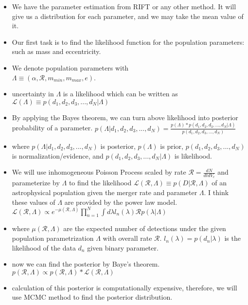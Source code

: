 \documentclass[twocolumn,prd,nofootinbib]{revtex4}
\begin{document}
\begin{itemize}
    \item We have the parameter estimation from RIFT or any other method. It will give us a distribution for each parameter, and we may take the mean value of it.
    \item Our first task is to find the likelihood function for the population parameters: such as mass and eccentricity.
    \item We denote population parameters with \\ $\Lambda \equiv  (\alpha, \mathcal{R}, m_{min}, m_{max}, e)$.
    \item uncertainty in $\Lambda$ is a likelihood which can be written as $\mathcal{L}(\Lambda)\equiv p(d_1,d_2,d_3,...,d_N|\Lambda)$
    \item By applying the Bayes theorem, we can turn above likelihood into posterior probability of a parameter.
    $p(\Lambda|d_1,d_2,d_3,...,d_N)= \frac{p(\Lambda)*p(d_1,d_2,d_3,...,d_N|\Lambda)}{p(d_1,d_2,d_3,...,d_N)}$
    \item where $p(\Lambda|d_1,d_2,d_3,...,d_N)$ is posterior, $p(\Lambda)$ is prior, $p(d_1,d_2,d_3,...,d_N)$ is normalization/evidence, and $p(d_1,d_2,d_3,...,d_N|\Lambda)$ is likelihood.
    \item We will use inhomogeneous Poisson Process scaled by rate $\mathcal{R} = \frac{dN}{dtdV_c}$ and parameterize by $\Lambda$ to find the likelihood  $\mathcal{L}(\mathcal{R},\Lambda)\equiv p(D|\mathcal{R},\Lambda)$ of an astrophysical population given the merger rate and parameter $\Lambda$. 
    {\color{red}I think these values of $\Lambda$ are provided by the power law model}. \\
    $\mathcal{L}(\mathcal{R},\Lambda) \propto e^{-\mu(\mathcal{R},\Lambda)}\prod_{n=1}^N\int d\lambda l_n(\lambda) \mathcal{R} p(\lambda|\Lambda)$
    \item where $\mu(\mathcal{R},\Lambda)$ are the expected number of detections under the given population parametrization $\Lambda$ with overall rate $\mathcal{R}$. $l_n(\lambda)=p(d_n|\lambda)$ is the likelihood of the data $d_n$ given binary parameter.
    \item now we can find the posterior by Baye's theorem. \\
    $p(\mathcal{R,\Lambda})\propto p(\mathcal{R},\Lambda) * \mathcal{L}(\mathcal{R},\Lambda)$
    \item calculation of this posterior is computationally expensive, therefore, we will use MCMC method to find the posterior distribution.
    
\end{itemize}
\end{document}
